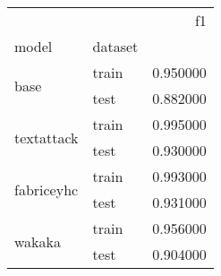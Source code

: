 \begin{tabular}{llr}
 &  & f1 \\
model & dataset &  \\
\multirow[c]{2}{*}{base} & train & 0.950000 \\
 & test & 0.882000 \\
\multirow[c]{2}{*}{textattack} & train & 0.995000 \\
 & test & 0.930000 \\
\multirow[c]{2}{*}{fabriceyhc} & train & 0.993000 \\
 & test & 0.931000 \\
\multirow[c]{2}{*}{wakaka} & train & 0.956000 \\
 & test & 0.904000 \\
\end{tabular}
